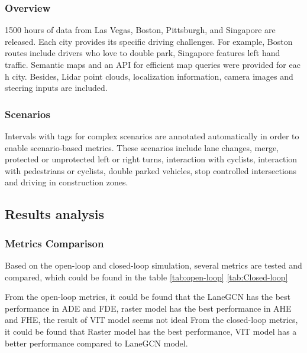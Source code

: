 \documentclass[10pt,conference,compsocconf]{IEEEtran}
\begin{document}
\subsubsection{Overview}

1500 hours of data from Las Vegas, Boston, Pittsburgh, and Singapore are released. Each city provides its specific driving challenges. For example, Boston routes include drivers who love to double park, Singapore features left hand traffic. Semantic maps and an API for efficient map queries were provided for eac
h city. Besides, Lidar point clouds, localization information, camera images and steering inputs are included.

\subsubsection{Scenarios}

Intervals with tags for complex scenarios are annotated automatically in order to enable scenario-based metrics. These scenarios include lane changes, merge, protected or unprotected left or right turns, interaction with 
cyclists, interaction with pedestrians or cyclists, double parked vehicles, stop controlled intersections and driving in construction zones.
\subsection{Results analysis}
\subsubsection{Metrics Comparison}
Based on the open-loop and closed-loop simulation, several metrics are tested and compared, which could be found in the table \ref{tab:open-loop}
\ref{tab:Closed-loop}

From the open-loop metrics, it could be found that  the LaneGCN has the best performance in ADE and FDE, raster model has the best performance in AHE and FHE, the result of VIT model seems not ideal
From the closed-loop metrics, it could be found that  Raster model has the best performance, VIT model has a better performance compared to LaneGCN model.
\end{document}
